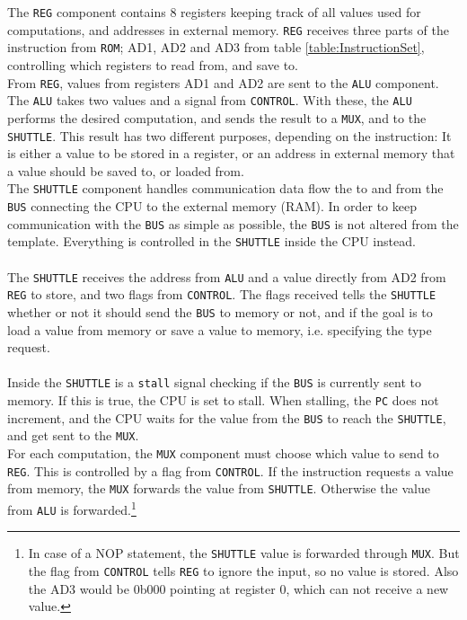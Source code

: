 The \texttt{REG} component contains 8 registers keeping track of all values used for computations, and addresses in external memory.
\texttt{REG} receives three parts of the instruction from \texttt{ROM}; AD1, AD2 and AD3 from table \ref{table:InstructionSet}, controlling which registers to read from, and save to. \\

From \texttt{REG}, values from registers AD1 and AD2 are sent to the \texttt{ALU} component. The \texttt{ALU} takes two values and a signal from \texttt{CONTROL}. With these, the \texttt{ALU} performs the desired computation, and sends the result to a \texttt{MUX}, and to the \texttt{SHUTTLE}. This result has two different purposes, depending on the instruction: It is either a value to be stored in a register, or an address in external memory that a value should be saved to, or loaded from. \\

The \texttt{SHUTTLE} component handles communication data flow the to and from the \texttt{BUS} 
connecting the CPU to the external memory (RAM). In order to keep communication with the \texttt{BUS} as simple as possible, the \texttt{BUS} is not altered from the template. Everything is controlled in the \texttt{SHUTTLE} inside the CPU instead. \\
\\
The \texttt{SHUTTLE} receives the address from \texttt{ALU} and a value directly from AD2 from \texttt{REG} to store, and two flags from \texttt{CONTROL}. The flags received tells the \texttt{SHUTTLE} whether or not it should send the \texttt{BUS} to memory or not, and if the goal is to load a value from memory or save a value to memory, i.e. specifying the type request. \\
\\
Inside the \texttt{SHUTTLE} is a \texttt{stall} signal checking if the \texttt{BUS} is currently sent to memory. If this is true, the CPU is set to stall. When stalling, the \texttt{PC} does not increment, and the CPU waits for the value from the \texttt{BUS} to reach the \texttt{SHUTTLE}, and get sent to the \texttt{MUX}. \\

For each computation, the \texttt{MUX} component must choose which value to send to \texttt{REG}. This is controlled by a flag from \texttt{CONTROL}. If the instruction requests a value from memory, the \texttt{MUX} forwards the value from \texttt{SHUTTLE}. Otherwise the value from \texttt{ALU} is forwarded.\footnote{In case of a NOP statement, the \texttt{SHUTTLE} value is forwarded through \texttt{MUX}. But the flag from \texttt{CONTROL} tells \texttt{REG} to ignore the input, so no value is stored. Also the AD3 would be 0b000 pointing at register 0, which can not receive a new value.}